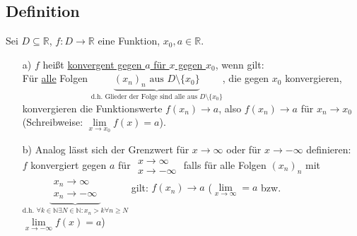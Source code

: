 \documentclass[12pt, titlepage]{article}
\newcommand{\R}{\mathds{R}}
\newcommand{\N}{\mathds{N}}
\renewcommand{\*}{\cdot}
\begin{document}
	\subsection{Definition}
	Sei $D\subseteq\R$, $f\colon D\rightarrow\R$ eine Funktion, $x_0,a\in\R$.
	\begin{itemize}
		\item[a)] $f$ heißt \underline{konvergent gegen $a$ für $x$ gegen $x_0$}, wenn gilt:\\
		Für \underline{alle} Folgen $\underbrace{(x_n)_n\textrm{ aus }D\setminus\{x_0\}}_{\textrm{d.h. Glieder der Folge sind alle aus } D\setminus\{x_0\}}$, die gegen $x_0$ konvergieren, konvergieren die Funktionswerte $f(x_n)\rightarrow a$, also $f(x_n)\rightarrow a$ für $x_n\rightarrow x_0$ (Schreibweise: $\lim\limits_{x\rightarrow x_0}f(x)=a$).
		\item[b)] Analog lässt sich der Grenzwert für $x\rightarrow\infty$ oder für $x\rightarrow-\infty$ definieren:\\
		$f$ konvergiert gegen $a$ für
		$\begin{array}{l}
		x\rightarrow\infty\\
		x\rightarrow-\infty
		\end{array}$ falls für alle Folgen $(x_n)_n$ mit $\underbrace{\begin{array}{l}
		x_n\rightarrow\infty\\
		x_n\rightarrow-\infty
		\end{array}}_{\textrm{d.h. }\forall k\in\N\exists N\in\N\colon x_n>k\forall n\geq N}$ gilt: $f(x_n)\rightarrow a$ ($\lim\limits_{x\rightarrow\infty}=a$ bzw. $\lim\limits_{x\rightarrow-\infty}f(x)=a$)
	\end{itemize}
\end{document}
